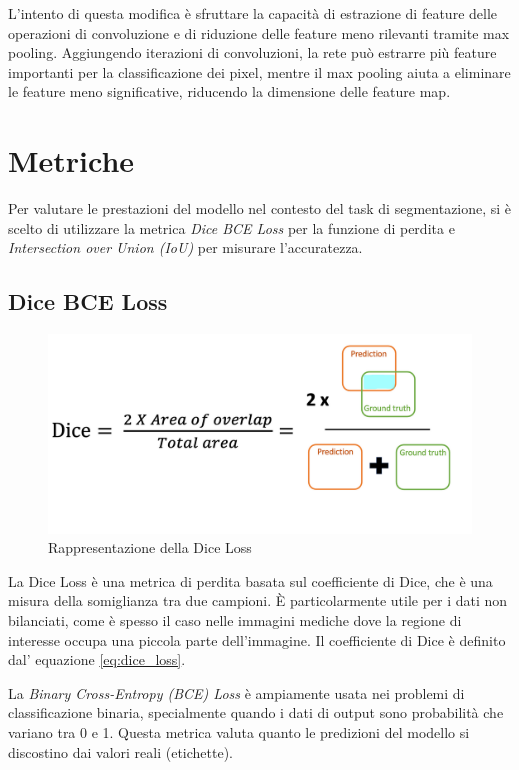 L'intento di questa modifica è sfruttare la capacità di estrazione di feature delle operazioni di
convoluzione e di riduzione delle feature meno rilevanti tramite max pooling. Aggiungendo iterazioni
di convoluzioni, la rete può estrarre più feature importanti per la classificazione dei pixel,
mentre il max pooling aiuta a eliminare le feature meno significative, riducendo la dimensione delle
feature map.



\section{Metriche}
\label{sec:metriche}

Per valutare le prestazioni del modello nel contesto del task di segmentazione, si è scelto di
utilizzare la metrica \textit{Dice BCE Loss} per la funzione di perdita e \textit{Intersection over
	Union (IoU)} per misurare l'accuratezza.

\subsection{Dice BCE Loss}
\begin{figure}[!ht]
	\centering
	\includegraphics[width=0.7\columnwidth]{Immagini/dice_loss.png}
	\caption{Rappresentazione della Dice Loss}
	\label{fig:dice_loss}
\end{figure}

La Dice Loss è una metrica di perdita basata sul coefficiente di Dice, che è una
misura della somiglianza tra due campioni. È particolarmente utile per i dati
non bilanciati, come è spesso il caso nelle immagini mediche dove la regione di
interesse occupa una piccola parte dell'immagine. Il coefficiente di Dice è
definito dal' equazione \ref{eq:dice_loss}.

La \textit{Binary Cross-Entropy (BCE) Loss} è ampiamente usata nei problemi di classificazione
binaria, specialmente quando i dati di output sono probabilità che variano tra 0 e 1. Questa metrica
valuta quanto le predizioni del modello si discostino dai valori reali (etichette).

